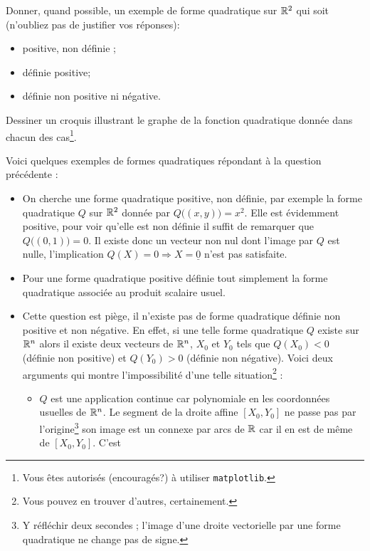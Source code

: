 \documentclass[11pt, a4paper]{article}
\begin{document}
\begin{question}
  Donner, quand possible, un exemple de forme quadratique sur $\mathbb{R}^2$ qui
  soit (n'oubliez pas de justifier vos réponses):
  \begin{itemize}
  \item
    positive, non définie ;
  \item
    définie positive;
  \item
    définie non positive ni négative.
  \end{itemize}
  Dessiner un croquis illustrant le graphe de la fonction quadratique
  donnée dans chacun des cas\footnote{Vous êtes autorisés
    (encouragés?) à utiliser \texttt{matplotlib}.}.
\end{question}
\begin{solution}
  Voici quelques exemples de formes quadratiques répondant à la
  question précédente :
  \begin{itemize}
  \item On cherche une forme quadratique positive, non
    définie, par exemple la forme quadratique $Q$ sur $\mathbb{R}^2$ donnée
    par $Q\big((x,y)\big) = x^2$. Elle est évidemment positive, pour
    voir qu'elle est non définie il suffit de remarquer que
    $Q\big((0,1)\big) = 0$. Il existe donc un vecteur non nul dont
    l'image par $Q$ est nulle, l'implication
    $Q(X) = 0 \Rightarrow X = \underline{0}$ n'est pas satisfaite.
  \item Pour une forme quadratique positive définie tout
    simplement la forme quadratique associée au produit scalaire
    usuel.
  \item Cette question est piège, il n'existe pas de forme
    quadratique définie non positive et non négative. En effet, si une
    telle forme quadratique $Q$ existe sur $\mathbb{R}^n$ alors il existe deux
    vecteurs de $\mathbb{R}^n$, $X_0$ et $Y_0$ tels que $Q(X_0) < 0$ (définie
    non positive) et $Q(Y_0) > 0$ (définie non négative). Voici deux
    arguments qui montre l'impossibilité d'une telle
    situation\footnote{Vous pouvez en trouver d'autres, certainement.}
    :
    \begin{itemize}
    \item $Q$ est une application continue car polynomiale en les
      coordonnées usuelles de $\mathbb{R}^n$. Le segment de la droite affine
      $[X_0, Y_0]$ ne passe pas par l'origine\footnote{Y réfléchir
        deux secondes ; l'image d'une droite vectorielle par une forme
        quadratique ne change pas de signe.} son image est un connexe
      par arcs de $\mathbb{R}$ car il en est de même de $[X_0, Y_0]$. C'est

\end{itemize}
\end{itemize}
\end{solution}
\end{document}
